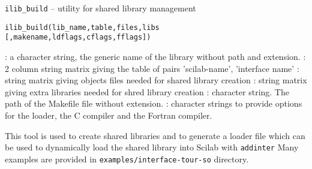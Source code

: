 
\begin{mandesc}
  \texttt{ilib\_build} --  utility for shared library management\\ %
\end{mandesc}
\label{ilib-build}
\begin{calling_sequence}
\begin{verbatim}
ilib_build(lib_name,table,files,libs [,makename,ldflags,cflags,fflags])  
\end{verbatim}
\end{calling_sequence}
\begin{parameters}
  \begin{varlist}
     : a character string, the generic name of the library without path and extension.
     : 2 column string matrix giving the table of pairs 'scilab-name', 'interface name'
     : string matrix giving objects files needed for shared library creation
     : string matrix giving extra libraries needed for shred library creation
     : character string. The path of the Makefile file without extension.
     : character strings to provide options for the loader, the C compiler and the Fortran compiler.
  \end{varlist}
\end{parameters}
\begin{mandescription}
  This tool is used to create shared libraries and to generate a 
  loader file which can be used to dynamically load the shared library 
  into Scilab with \verb!addinter!
  Many examples are provided in \verb!examples/interface-tour-so!
  directory.
\end{mandescription}
